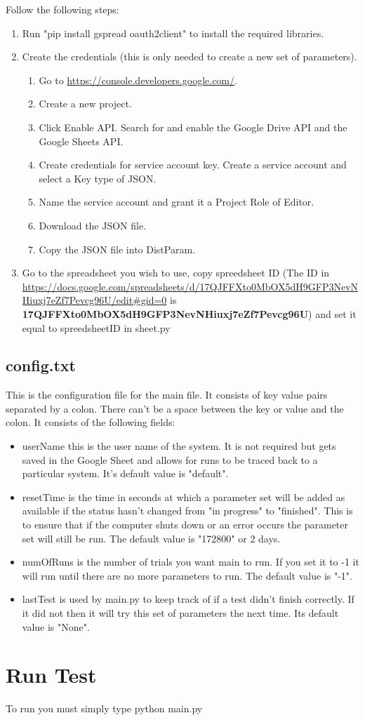 \documentclass[12pt]{article}
\begin{document}
Follow the following steps:\\
\begin{enumerate}
	\item Run "pip install gspread oauth2client" to install the required libraries.\\
	\item Create the credentials (this is only needed to create a new set of parameters).
	\begin{enumerate}
		\item Go to \href{https://console.developers.google.com/}{https://console.developers.google.com/}.
		\item Create a new project.
		\item Click Enable API. Search for and enable the Google Drive API and the Google Sheets API.
		\item Create credentials for service account key.  Create a service account and select a Key type of JSON.  
		\item Name the service account and grant it a Project Role of Editor.
		\item Download the JSON file.
		\item Copy the JSON file into DistParam.
	\end{enumerate}
	\item Go to the spreadsheet you wish to use, copy spreedsheet ID (The ID in  \url{https://docs.google.com/spreadsheets/d/17QJFFXto0MbOX5dH9GFP3NevNHiuxj7eZf7Pevcg96U/edit#gid=0} is \textbf{17QJFFXto0MbOX5dH9GFP3NevNHiuxj7eZf7Pevcg96U}) and set it equal to spreedsheetID in sheet.py
\end{enumerate}


\subsection{config.txt}
This is the configuration file for the main file.  It consists of key value pairs separated by a colon.  There can't be a space between the key or value and the colon.  It consists of the following fields:
\begin{itemize}
	\item userName this is the user name of the system.  It is not required but gets saved in the Google Sheet and allows for runs to be traced back to a particular system.  It's default value is "default".
	\item resetTime is the time in seconds at which a parameter set will be added as available if the status hasn't changed from "in progress" to "finished".  This is to ensure that if the computer shuts down or an error occurs the parameter set will still be run.  The default value is "172800" or 2 days.
	\item numOfRuns is the number of trials you want main to run.  If you set it to -1 it will run until there are no more parameters to run.  The default value is "-1".
	\item lastTest is used by main.py to keep track of if a test didn't finish correctly.  If it did not then it will try this set of parameters the next time.  Its default value is "None".
\end{itemize}

\section{Run Test}
To run you must simply type python main.py
\end{document}
